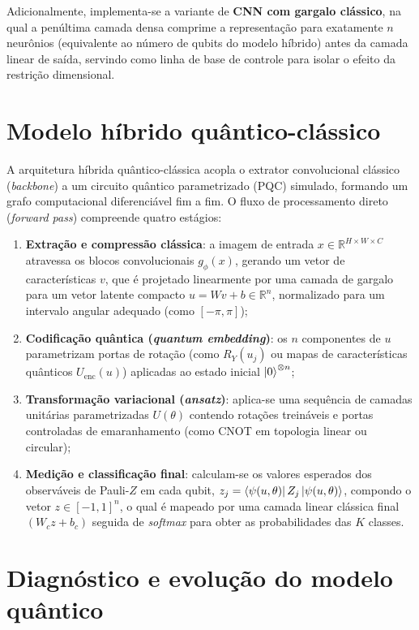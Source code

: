 \documentclass[
    12pt,
    openright,
    oneside,
    a4paper,
    english,
    brazil
]{abntex2}
\begin{document}
Adicionalmente, implementa-se a variante de \textbf{CNN com gargalo clássico}, na qual a penúltima camada densa comprime a representação para exatamente \(n\) neurônios (equivalente ao número de qubits do modelo híbrido) antes da camada linear de saída, servindo como linha de base de controle para isolar o efeito da restrição dimensional.

\section{Modelo híbrido quântico-clássico}

A arquitetura híbrida quântico-clássica acopla o extrator convolucional clássico (\textit{backbone}) a um circuito quântico parametrizado (PQC) simulado, formando um grafo computacional diferenciável fim a fim. O fluxo de processamento direto (\textit{forward pass}) compreende quatro estágios:
\begin{enumerate}
    \item \textbf{Extração e compressão clássica}: a imagem de entrada \(x \in \mathbb{R}^{H \times W \times C}\) atravessa os blocos convolucionais \(g_{\phi}(x)\), gerando um vetor de características \(v\), que é projetado linearmente por uma camada de gargalo para um vetor latente compacto \(u = Wv + b \in \mathbb{R}^{n}\), normalizado para um intervalo angular adequado (como \([-\pi, \pi]\));
    \item \textbf{Codificação quântica (\textit{quantum embedding})}: os \(n\) componentes de \(u\) parametrizam portas de rotação (como \(R_Y(u_j)\) ou mapas de características quânticos \(U_{\text{enc}}(u)\)) aplicadas ao estado inicial \(\ket{0}^{\otimes n}\);
    \item \textbf{Transformação variacional (\textit{ansatz})}: aplica-se uma sequência de camadas unitárias parametrizadas \(U(\theta)\) contendo rotações treináveis e portas controladas de emaranhamento (como CNOT em topologia linear ou circular);
    \item \textbf{Medição e classificação final}: calculam-se os valores esperados dos observáveis de Pauli-\(Z\) em cada qubit, \(z_j = \bra{\psi(u,\theta)}Z_j\ket{\psi(u,\theta)}\), compondo o vetor \(z \in [-1, 1]^n\), o qual é mapeado por uma camada linear clássica final \((W_c z + b_c)\) seguida de \textit{softmax} para obter as probabilidades das \(K\) classes.
\end{enumerate}

\section{Diagnóstico e evolução do modelo quântico}
\end{document}
